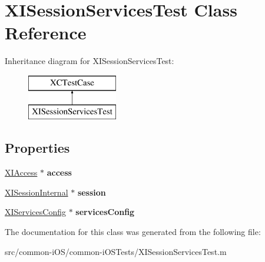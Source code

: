 \hypertarget{interface_x_i_session_services_test}{}\section{X\+I\+Session\+Services\+Test Class Reference}
\label{interface_x_i_session_services_test}
Inheritance diagram for X\+I\+Session\+Services\+Test\+:\begin{figure}[H]
\begin{center}
\leavevmode
\includegraphics[height=2.000000cm]{interface_x_i_session_services_test}
\end{center}
\end{figure}
\subsection*{Properties}
\begin{DoxyCompactItemize}
\item 
\hypertarget{interface_x_i_session_services_test_a19c35b368cd0e1f356f1095b023e0f02}{}\label{interface_x_i_session_services_test_a19c35b368cd0e1f356f1095b023e0f02} 
\hyperlink{class_x_i_access}{X\+I\+Access} $\ast$ {\bfseries access}
\item 
\hypertarget{interface_x_i_session_services_test_ab21ef81bfbe52ff47fd149d953b00106}{}\label{interface_x_i_session_services_test_ab21ef81bfbe52ff47fd149d953b00106} 
\hyperlink{interface_x_i_session_internal}{X\+I\+Session\+Internal} $\ast$ {\bfseries session}
\item 
\hypertarget{interface_x_i_session_services_test_ab850d4f334179209831dcc48deab3178}{}\label{interface_x_i_session_services_test_ab850d4f334179209831dcc48deab3178} 
\hyperlink{interface_x_i_services_config}{X\+I\+Services\+Config} $\ast$ {\bfseries services\+Config}
\end{DoxyCompactItemize}


The documentation for this class was generated from the following file\+:\begin{DoxyCompactItemize}
\item 
src/common-\/i\+O\+S/common-\/i\+O\+S\+Tests/X\+I\+Session\+Services\+Test.\+m\end{DoxyCompactItemize}
